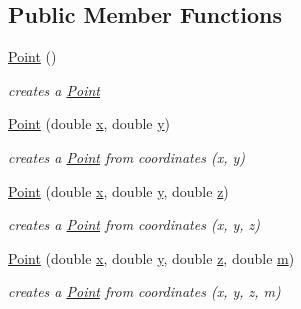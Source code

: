 \subsection*{Public Member Functions}
\begin{DoxyCompactItemize}
\item 
\hyperlink{classsimo_1_1shapes_1_1_point_a754115ccb65d25bc28dadee1d62f5955}{Point} ()
\begin{DoxyCompactList}\small\item\em creates a \hyperlink{classsimo_1_1shapes_1_1_point}{Point} \end{DoxyCompactList}\item 
\hyperlink{classsimo_1_1shapes_1_1_point_a4932bd8b5eeccc1767de9bfb2f65f1c3}{Point} (double \hyperlink{classsimo_1_1shapes_1_1_point_aa4abc96b03859b69bb1af19099a9799f}{x}, double \hyperlink{classsimo_1_1shapes_1_1_point_a370ca8d7d03517735a9792cca7cbb05e}{y})
\begin{DoxyCompactList}\small\item\em creates a \hyperlink{classsimo_1_1shapes_1_1_point}{Point} from coordinates (x, y) \end{DoxyCompactList}\item 
\hyperlink{classsimo_1_1shapes_1_1_point_ac1c250658a3cc7bee49ec49c57431d7a}{Point} (double \hyperlink{classsimo_1_1shapes_1_1_point_aa4abc96b03859b69bb1af19099a9799f}{x}, double \hyperlink{classsimo_1_1shapes_1_1_point_a370ca8d7d03517735a9792cca7cbb05e}{y}, double \hyperlink{classsimo_1_1shapes_1_1_point_a4498c1e84bb25e32cd75d41a74d48169}{z})
\begin{DoxyCompactList}\small\item\em creates a \hyperlink{classsimo_1_1shapes_1_1_point}{Point} from coordinates (x, y, z) \end{DoxyCompactList}\item 
\hyperlink{classsimo_1_1shapes_1_1_point_a30ce91412930c35da44537bd8b5a6ea1}{Point} (double \hyperlink{classsimo_1_1shapes_1_1_point_aa4abc96b03859b69bb1af19099a9799f}{x}, double \hyperlink{classsimo_1_1shapes_1_1_point_a370ca8d7d03517735a9792cca7cbb05e}{y}, double \hyperlink{classsimo_1_1shapes_1_1_point_a4498c1e84bb25e32cd75d41a74d48169}{z}, double \hyperlink{classsimo_1_1shapes_1_1_point_aced73731924b13762c7b6446bf3ad9a5}{m})
\begin{DoxyCompactList}\small\item\em creates a \hyperlink{classsimo_1_1shapes_1_1_point}{Point} from coordinates (x, y, z, m) \end{DoxyCompactList}\item 

\end{DoxyCompactItemize}

